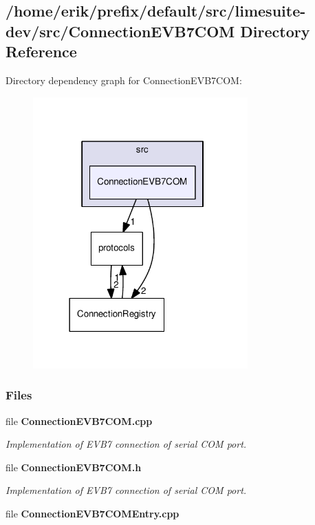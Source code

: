 \subsection{/home/erik/prefix/default/src/limesuite-\/dev/src/\+Connection\+E\+V\+B7\+C\+OM Directory Reference}
\label{dir_a1368bbdd86e27bebe14154cff541921}
Directory dependency graph for Connection\+E\+V\+B7\+C\+OM\+:
\nopagebreak
\begin{figure}[H]
\begin{center}
\leavevmode
\includegraphics[width=234pt]{dir_a1368bbdd86e27bebe14154cff541921_dep}
\end{center}
\end{figure}
\subsubsection*{Files}
\begin{DoxyCompactItemize}
\item 
file {\bf Connection\+E\+V\+B7\+C\+O\+M.\+cpp}
\begin{DoxyCompactList}\small\item\em Implementation of E\+V\+B7 connection of serial C\+OM port. \end{DoxyCompactList}\item 
file {\bf Connection\+E\+V\+B7\+C\+O\+M.\+h}
\begin{DoxyCompactList}\small\item\em Implementation of E\+V\+B7 connection of serial C\+OM port. \end{DoxyCompactList}\item 
file {\bf Connection\+E\+V\+B7\+C\+O\+M\+Entry.\+cpp}
\end{DoxyCompactItemize}
